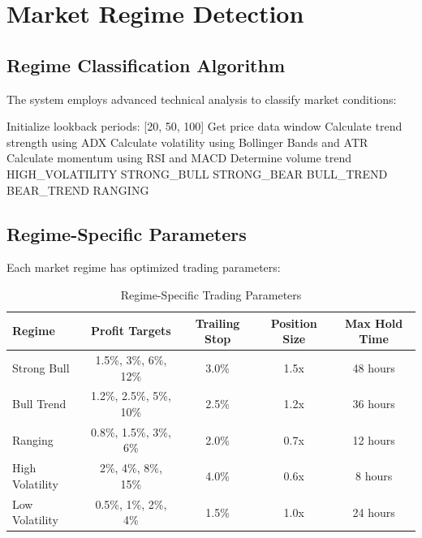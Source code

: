 \documentclass[11pt,a4paper]{article}
\begin{document}
\section{Market Regime Detection}

\subsection{Regime Classification Algorithm}

The system employs advanced technical analysis to classify market conditions:

\begin{algorithm}[H]
\caption{Market Regime Detection Algorithm}
\begin{algorithmic}[1]
\State Initialize lookback periods: [20, 50, 100]
\State Get price data window
\State Calculate trend strength using ADX
\State Calculate volatility using Bollinger Bands and ATR
\State Calculate momentum using RSI and MACD
\State Determine volume trend
    \State \Return HIGH\_VOLATILITY
        \State \Return STRONG\_BULL
        \State \Return STRONG\_BEAR
    \EndIf
{}
        \State \Return BULL\_TREND
        \State \Return BEAR\_TREND
    \EndIf
\Else
    \State \Return RANGING
\EndIf
\end{algorithmic}
\end{algorithm}

\subsection{Regime-Specific Parameters}

Each market regime has optimized trading parameters:

\begin{table}[H]
\centering
\caption{Regime-Specific Trading Parameters}
\label{tab:regime_params}
\begin{tabular}{@{}lcccc@{}}
\toprule
Regime & Profit Targets & Trailing Stop & Position Size & Max Hold Time \\
\midrule
Strong Bull & 1.5\%, 3\%, 6\%, 12\% & 3.0\% & 1.5x & 48 hours \\
Bull Trend & 1.2\%, 2.5\%, 5\%, 10\% & 2.5\% & 1.2x & 36 hours \\
Ranging & 0.8\%, 1.5\%, 3\%, 6\% & 2.0\% & 0.7x & 12 hours \\
High Volatility & 2\%, 4\%, 8\%, 15\% & 4.0\% & 0.6x & 8 hours \\
Low Volatility & 0.5\%, 1\%, 2\%, 4\% & 1.5\% & 1.0x & 24 hours \\
\bottomrule
\end{tabular}
\end{table}
\end{document}
